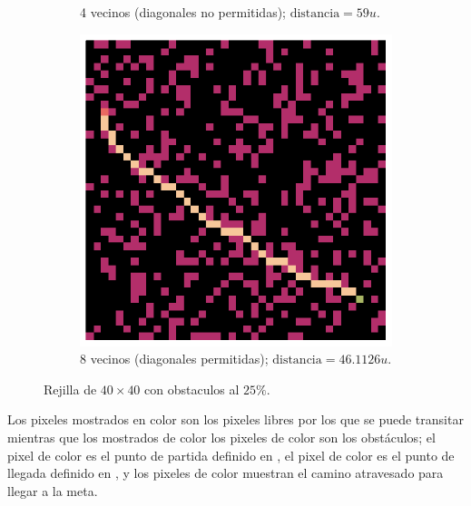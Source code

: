 \begin{enumerate}
\begin{solution}
\begin{figure}[ht!]
\begin{subfigure}{0.4\textwidth}
                \caption{4 vecinos (diagonales no permitidas); $\text{distancia} = 59 u$.}
                \label{fig:nodiags_obs_25percent_40x40}
            \end{subfigure}
            \hspace{1cm}
            \begin{subfigure}{0.4\textwidth}
                \centering
                \includegraphics[scale=0.3]{../figures/path_01_diag.png}
                \caption{8 vecinos (diagonales permitidas); $\text{distancia} = 46.1126 u$.}
                \label{fig:diags_obs_25percent_40x40}
            \end{subfigure}
            \caption{Rejilla de $40 \times 40$ con obstaculos al $25\%$.}
            \label{fig:rejilla_40x40}
        \end{figure}

        Los pixeles mostrados en color  son los pixeles libres por los que se puede transitar mientras que los mostrados de color los pixeles de color  son los obstáculos; el pixel de color  es el punto de partida definido en , el pixel de color  es el punto de llegada definido en , y los pixeles de color  muestran el camino atravesado para llegar a la meta.


\end{solution}
\end{enumerate}
